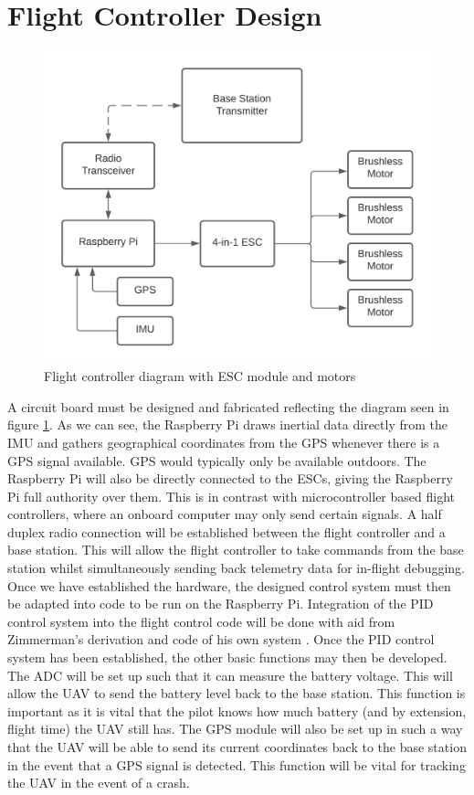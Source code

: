\documentclass[english]{upeeei}
\begin{document}
\section{Flight Controller Design}
\begin{figure}[h]
    \centering
    \includegraphics[scale=0.5]{images/FC diagram_finalna.png}
    \caption{Flight controller diagram with ESC module and motors}
    \label{fig:final_FC_diagram_na}
\end{figure}
A circuit board must be designed and fabricated reflecting the diagram seen in figure \ref{fig:final_FC_diagram_na}. As we can see,
the Raspberry Pi draws inertial data directly from the IMU and gathers geographical coordinates from the GPS whenever there is a GPS
signal available. GPS would typically only be available outdoors. The Raspberry Pi will also be directly connected to the ESCs, giving
the Raspberry Pi full authority over them. This is in contrast with microcontroller based flight controllers, where an onboard computer
may only send certain signals. A half duplex radio connection will be established between the flight controller and a base station. 
This will allow the flight controller to take commands from the base station whilst simultaneously sending back telemetry data for 
in-flight debugging. 
\newline
\newline
Once we have established the hardware, the designed control system must then be adapted into code to be run on the Raspberry Pi. 
Integration of the PID control system into the flight control code will be done with aid from Zimmerman's 
derivation and code of his own system \cite{zimmerman2016}. Once the PID control system has been established, the other basic 
functions may then be developed. The ADC will be set up such that it can measure the battery voltage. This will allow the UAV to
send the battery level back to the base station. This function is important as it is vital that the pilot knows how much battery
(and by extension, flight time) the UAV still has. The GPS module will also be set up in such a way that the UAV will be able to
send its current coordinates back to the base station in the event that a GPS signal is detected. This function will be vital for
tracking the UAV in the event of a crash.
\end{document}
